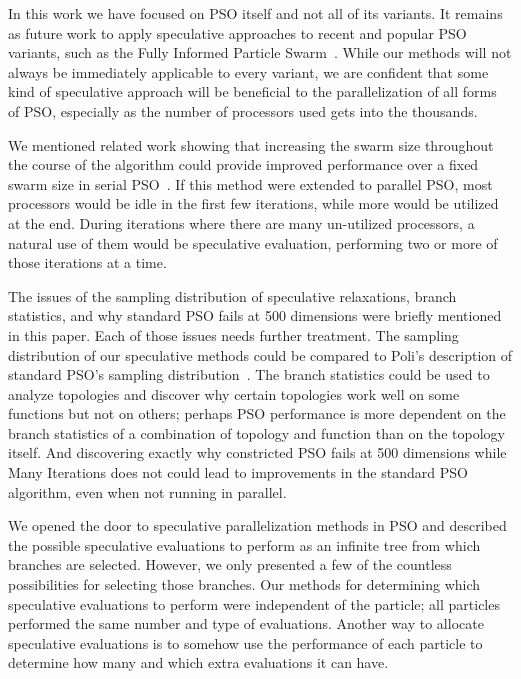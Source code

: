 \documentclass[ms,electronic,twosidetoc,letterpaper,chaptercenter,parttop,equalmargins]{byumsphd}
\begin{document}
In this work we have focused on PSO itself and not all of its variants.  It
remains as future work to apply speculative approaches to recent and popular
PSO variants, such as the Fully Informed Particle
Swarm~\citep{mendes-2004-fully-informed-particle-swarm}.  While our methods
will not always be immediately applicable to every variant, we are confident
that some kind of speculative approach will be beneficial to the
parallelization of all forms of PSO, especially as the number of processors
used gets into the thousands.

We mentioned related work showing that increasing the swarm size throughout the
course of the algorithm could provide improved performance over a fixed swarm
size in serial PSO~\citep{montes-de-oca-2010-incremental-social-learning-pso}.
If this method were extended to parallel PSO, most processors would be idle in
the first few iterations, while more would be utilized at the end.  During
iterations where there are many un-utilized processors, a natural use of them
would be speculative evaluation, performing two or more of those iterations at
a time.

The issues of the sampling distribution of speculative relaxations, branch
statistics, and why standard PSO fails at 500 dimensions were briefly mentioned
in this paper.  Each of those issues needs further treatment.  The sampling
distribution of our speculative methods could be compared to Poli's description
of standard PSO's sampling
distribution~\citep{poli-2008-sampling-distribution-of-pso}.  The branch
statistics could be used to analyze topologies and discover why certain
topologies work well on some functions but not on others; perhaps PSO
performance is more dependent on the branch statistics of a combination of
topology and function than on the topology itself.  And discovering exactly why
constricted PSO fails at 500 dimensions while Many Iterations does not could
lead to improvements in the standard PSO algorithm, even when not running in
parallel.

We opened the door to speculative parallelization methods in PSO and described
the possible speculative evaluations to perform as an infinite tree from which
branches are selected.  However, we only presented a few of the countless
possibilities for selecting those branches.  Our methods for determining which
speculative evaluations to perform were independent of the particle; all
particles performed the same number and type of evaluations.  Another way to
allocate speculative evaluations is to somehow use the performance of each
particle to determine how many and which extra evaluations it can have.
\end{document}
